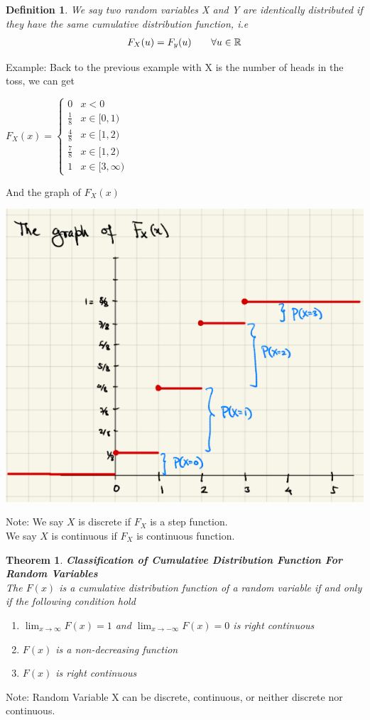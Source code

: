 \documentclass[11pt,oneside]{book}
\theoremstyle{break}
\theoremstyle{break}
\newtheorem{thm}{Theorem}[section]
\newtheorem{defn}{Definition}[corL]
\newcommand{\note}{\color{Purple}Note: \color{black}}
\newcommand{\example}{\color{WildStrawberry}Example: \color{black}}
\begin{document}
\begin{defn}
We say two random variables X and Y are identically distributed if they have the same cumulative distribution function, i.e\begin{align*}
F_X(u)=F_y(u) \text{\qquad} \forall u\in \mathbb{R}
\end{align*}
\end{defn}
\example Back to the previous example with X is the number of heads in the toss, we can get
\begin{center}
 $F_X(x)= \begin{cases}
0 & x<0\\
\frac{1}{8} & x\in [0,1)\\
\frac{4}{8} & x\in [1,2)\\
\frac{7}{8} & x\in [1,2)\\
1 & x\in [3,\infty)
\end{cases}$
\end{center}
And the graph of $F_X(x)$\begin{center}
\includegraphics[scale=0.5]{figures/graph_example}
\end{center}
\note We say $X$ is discrete if $F_X$ is a step function.\\
\text{\quad}\text{\qquad}We say $X$ is continuous if $F_X$ is continuous function.\\
\begin{thm}
\textbf{Classification of Cumulative Distribution Function For Random Variables}\\
The $F(x)$ is a cumulative distribution function of a random variable if and only if the following condition hold \begin{enumerate}
\item $\lim_{x\rightarrow \infty}F(x)=1$ and $\lim_{x\rightarrow -\infty}F(x)=0$ is right continuous
\item $F(x)$ is a non-decreasing function
\item $F(x)$ is right continuous
\end{enumerate}
\end{thm}
\note Random Variable X can be discrete, continuous, or neither discrete nor continuous.
\end{document}
